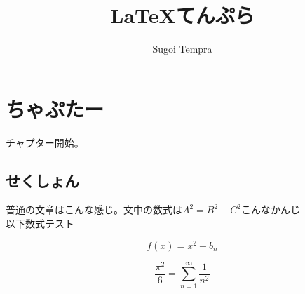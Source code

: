 \documentclass[11pt]{report}
\title{LaTeXてんぷら}
\author{Sugoi Tempra}
\begin{document}
\maketitle
\tableofcontents

\chapter{ちゃぷたー}
チャプター開始。
\section{せくしょん}
普通の文章はこんな感じ。文中の数式は$A^2=B^2+C^2$こんなかんじ\\
以下数式テスト

\begin{equation}
f(x)=x^2+b_n
\end{equation}

\begin{equation}
\frac{\pi^2}{6}=\sum_{n=1}^{\infty}\frac{1}{n^2}
\end{equation}
\end{document}

